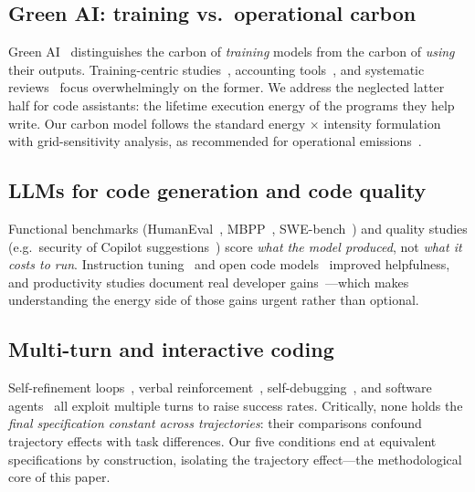 \documentclass[journal]{IEEEtran}
\begin{document}
\subsection{Green AI: training vs.\ operational carbon}
Green AI~\cite{schwartz2020} distinguishes the carbon of \emph{training}
models from the carbon of \emph{using} their outputs. Training-centric
studies~\cite{strubell2019, patterson2021, luccioni2022}, accounting
tools~\cite{lacoste2019, henderson2020, codecarbon2021}, and systematic
reviews~\cite{verdecchia2023} focus overwhelmingly on the former. We address
the neglected latter half for code assistants: the lifetime execution energy
of the programs they help write. Our carbon model follows the standard
energy $\times$ intensity formulation with grid-sensitivity analysis, as
recommended for operational emissions~\cite{patterson2021}.

\subsection{LLMs for code generation and code quality}
Functional benchmarks (HumanEval~\cite{chen2021}, MBPP~\cite{austin2021},
SWE-bench~\cite{jimenez2024}) and quality studies (e.g.\ security of
Copilot suggestions~\cite{pearce2022}) score \emph{what the model produced},
not \emph{what it costs to run}. Instruction tuning~\cite{ouyang2022} and
open code models~\cite{nijkamp2023, codellama2023, deepseek2024} improved
helpfulness, and productivity studies document real developer
gains~\cite{peng2023}---which makes understanding the energy side of those
gains urgent rather than optional.

\subsection{Multi-turn and interactive coding}
Self-refinement loops~\cite{madaan2023}, verbal reinforcement~\cite{shinn2023},
self-debugging~\cite{chen2023selfdebug}, and software agents~\cite{sweagent2024}
all exploit multiple turns to raise success rates. Critically, none holds
the \emph{final specification constant across trajectories}: their
comparisons confound trajectory effects with task differences. Our five
conditions end at equivalent specifications by construction, isolating the
trajectory effect---the methodological core of this paper.
\end{document}
